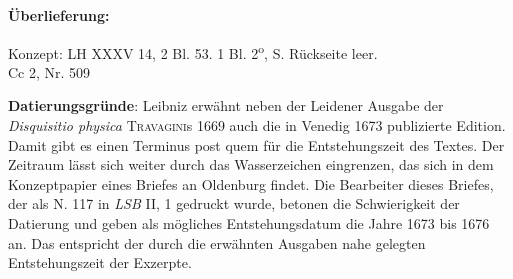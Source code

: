 \begin{ledgroupsized}[r]{120mm}
\footnotesize 
\pstart  
\noindent\textbf{\"{U}berlieferung:}  
\pend
\end{ledgroupsized}
\begin{ledgroupsized}[r]{114mm}
\footnotesize 
\pstart \parindent -6mm
Konzept: LH XXXV 14, 2 Bl. 53. 1 Bl. 2\textsuperscript{o},  S. R\"{u}ckseite leer.\\Cc 2, Nr. 509 \pend
\end{ledgroupsized}

\vspace*{5mm}
\begin{ledgroup}
\footnotesize \pstart
\noindent\footnotesize{\textbf{Datierungsgr\"{u}nde}: Leibniz erw\"{a}hnt neben der Leidener Ausgabe der \textit{Disquisitio physica} \textsc{Travagini}s 1669 auch die in Venedig 1673 publizierte Edition. Damit gibt es einen Terminus post quem f\"{u}r die Entstehungszeit des Textes. Der Zeitraum l\"{a}sst sich weiter durch das Wasserzeichen eingrenzen, das sich in dem Konzeptpapier eines Briefes an Oldenburg findet. Die Bearbeiter dieses Briefes, der als N. 117 in \textit{LSB} II, 1 gedruckt wurde, betonen die Schwierigkeit der Datierung und geben als m\"{o}gliches Entstehungsdatum die Jahre 1673 bis 1676 an. Das entspricht der durch die erw\"{a}hnten Ausgaben nahe gelegten Entstehungszeit der Exzerpte.}
\pend
\end{ledgroup}

